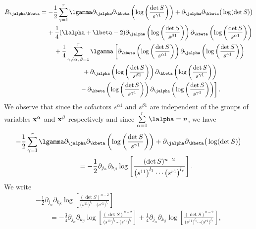 \begin{gather}
R_{\jalpha \kbeta}=-\frac{1}{2}\sum_{\gamma =1}^{r}\lgamma \partial_{\jalpha}\partial_{\kbeta}\left(\log\left(\frac{\det S}{s^{\gamma 1}}\right)\right)+\partial_{\jalpha}\partial_{\kbeta}\big(\log(\det S)\big)\nonumber\\
\hphantom{R_{\jalpha \kbeta}=}{} + \frac{1}{4}(\lalpha+\lbeta-2) \partial_{\jalpha}\left(\log\left(\frac{\det S}{s^{\beta 1}}\right)\right)\partial_{\kbeta}\left(\log\left(\frac{\det S}{s^{\alpha 1}}\right)\right)\nonumber\\
\hphantom{R_{\jalpha \kbeta}=}{}+\frac{1}{4}\sum_{\gamma \neq \alpha, \,\beta=1}^{r}\lgamma \left[\partial_{\kbeta}\left(\log\left(\frac{\det S}{s^{\alpha 1}}\right)\right) \partial_{\jalpha}\left(\log\left(\frac{\det S}{s^{\gamma 1}}\right)\right)\right.\nonumber\\
\hphantom{R_{\jalpha \kbeta}=}{}
+\partial_{\jalpha}\left(\log\left(\frac{\det S}{s^{\beta 1}}\right)\right)\partial_{\kbeta}\left(\log\left(\frac{\det S}{s^{\gamma 1}}\right)\right)\nonumber\\
\left.\hphantom{R_{\jalpha \kbeta}=}{} -\partial_{\kbeta}\left(\log\left(\frac{\det S}{s^{\gamma 1}}\right)\right)\partial_{\jalpha}\left(\log\left(\frac{\det S}{s^{\gamma 1}}\right)\right)\right].\label{Riccialmostfinal}
\end{gather}
We observe that since the cofactors $s^{\alpha 1}$ and $s^{\beta 1}$ are independent of the groups of variables ${\bf x}^{\alpha}$ and ${\bf x}^{\beta}$ respectively and since $\sum\limits_{\alpha=1}^{r}\lalpha = n$, we have
\begin{gather*}
-\frac{1}{2}\sum_{\gamma =1}^{r}\lgamma \partial_{\jalpha}\partial_{\kbeta}\left(\log\left(\frac{\det S}{s^{\gamma 1}}\right)\right)+\partial_{\jalpha}\partial_{\kbeta}\big(\log(\det S)\big)\\
\qquad{} =-\frac{1}{2}\partial_{j_{\alpha}}\partial_{k_{\beta}}\log\left[\frac{(\det S)^{n-2}}{\big(s^{11}\big)^{l_{1}}\cdots \big(s^{r1}\big)^{l_{r}}}\right].
\end{gather*}
We write
\begin{gather}
-\frac{1}{2}\partial_{j_{\alpha}}\partial_{k_{\beta}}\log\left[\frac{(\det S)^{n-2}}{\big(s^{11}\big)^{l_{1}}\cdots \big(s^{r1}\big)^{l_{r}}}\right]\nonumber\\
\qquad{} =-\frac{3}{4}\partial_{j_{\alpha}}\partial_{k_{\beta}}\log\left[\frac{(\det S)^{n-2}}{\big(s^{11}\big)^{l_{1}}\cdots \big(s^{r1}\big)^{l_{r}}}\right] +\frac{1}{4}\partial_{j_{\alpha}}\partial_{k_{\beta}}\log\left[\frac{(\det S)^{n-2}}{\big(s^{11}\big)^{l_{1}}\cdots \big(s^{r1}\big)^{l_{r}}}\right],\label{simplif}
\end{gather}
